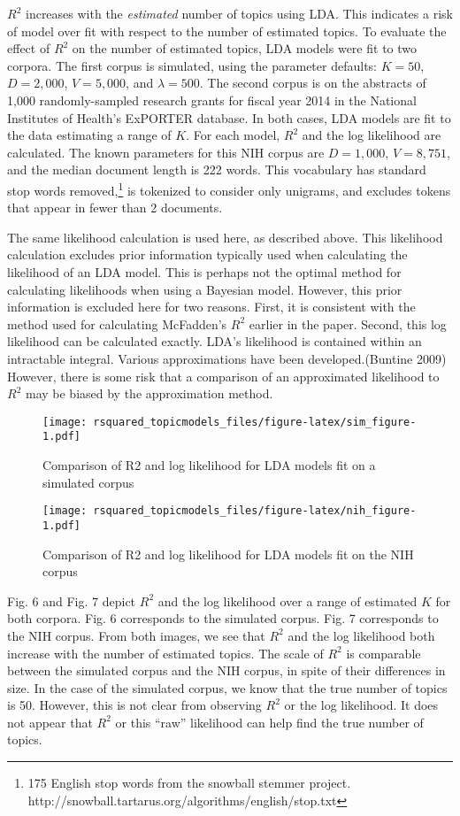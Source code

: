 \documentclass[conference,final,]{IEEEtran}
\makeatletter
\def\maxwidth{\ifdim\Gin@nat@width>\linewidth\linewidth
\else\Gin@nat@width\fi}
\let\Oldincludegraphics\includegraphics
\renewcommand{\includegraphics}[1]{\Oldincludegraphics[width=\maxwidth]{#1}}
\makeatother
\begin{document}
\(R^2\) increases with the \textit{estimated} number of topics using
LDA. This indicates a risk of model over fit with respect to the number
of estimated topics. To evaluate the effect of \(R^2\) on the number of
estimated topics, LDA models were fit to two corpora. The first corpus
is simulated, using the parameter defaults: \(K = 50\), \(D = 2,000\),
\(V = 5,000\), and \(\lambda = 500\). The second corpus is on the
abstracts of 1,000 randomly-sampled research grants for fiscal year 2014
in the National Institutes of Health's ExPORTER database. In both cases,
LDA models are fit to the data estimating a range of \(K\). For each
model, \(R^2\) and the log likelihood are calculated. The known
parameters for this NIH corpus are \(D = 1,000\), \(V = 8,751\), and the
median document length is 222 words. This vocabulary has standard stop
words removed,\footnote{175 English stop words from the snowball stemmer
  project. http://snowball.tartarus.org/algorithms/english/stop.txt} is
tokenized to consider only unigrams, and excludes tokens that appear in
fewer than 2 documents.

The same likelihood calculation is used here, as described above. This
likelihood calculation excludes prior information typically used when
calculating the likelihood of an LDA model. This is perhaps not the
optimal method for calculating likelihoods when using a Bayesian model.
However, this prior information is excluded here for two reasons. First,
it is consistent with the method used for calculating McFadden's \(R^2\)
earlier in the paper. Second, this log likelihood can be calculated
exactly. LDA's likelihood is contained within an intractable integral.
Various approximations have been developed.(Buntine 2009) However, there
is some risk that a comparison of an approximated likelihood to \(R^2\)
may be biased by the approximation method.

\begin{figure}
\centering
\texttt{[image: rsquared\_topicmodels\_files/figure-latex/sim\_figure-1.pdf]}
\caption{Comparison of R2 and log likelihood for LDA models fit on a
simulated corpus}
\end{figure}

\begin{figure}
\centering
\texttt{[image: rsquared\_topicmodels\_files/figure-latex/nih\_figure-1.pdf]}
\caption{Comparison of R2 and log likelihood for LDA models fit on the
NIH corpus}
\end{figure}

Fig. 6 and Fig. 7 depict \(R^2\) and the log likelihood over a range of
estimated \(K\) for both corpora. Fig. 6 corresponds to the simulated
corpus. Fig. 7 corresponds to the NIH corpus. From both images, we see
that \(R^2\) and the log likelihood both increase with the number of
estimated topics. The scale of \(R^2\) is comparable between the
simulated corpus and the NIH corpus, in spite of their differences in
size. In the case of the simulated corpus, we know that the true number
of topics is 50. However, this is not clear from observing \(R^2\) or
the log likelihood. It does not appear that \(R^2\) or this ``raw''
likelihood can help find the true number of topics.
\end{document}
